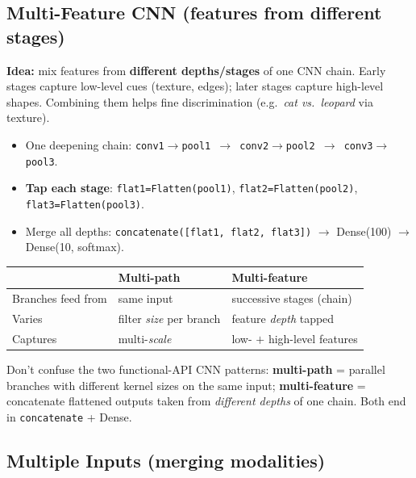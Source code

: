 \documentclass[10pt,a4paper]{article}
\begin{document}
	\subsection{Multi-Feature CNN (features from different stages)}

	\begin{definitionbox}
		\textbf{Idea:} mix features from \textbf{different depths/stages} of one CNN chain. Early stages capture low-level cues (texture, edges); later stages capture high-level shapes. Combining them helps fine discrimination (e.g.\ \emph{cat vs.\ leopard} via texture).
	\end{definitionbox}

	\begin{itemize}[leftmargin=*]
		\item One deepening chain: \texttt{conv1$\to$pool1 $\to$ conv2$\to$pool2 $\to$ conv3$\to$pool3}.
		\item \textbf{Tap each stage}: \texttt{flat1=Flatten(pool1)}, \texttt{flat2=Flatten(pool2)}, \texttt{flat3=Flatten(pool3)}.
		\item Merge all depths: \texttt{concatenate([flat1, flat2, flat3])} $\to$ Dense(100) $\to$ Dense(10, softmax).
	\end{itemize}

	\begin{center}
		\begin{tabular}{@{}lll@{}}
			\toprule
			& \textbf{Multi-path} & \textbf{Multi-feature} \\
			\midrule
			Branches feed from & same input        & successive stages (chain) \\
			Varies             & filter \emph{size} per branch & feature \emph{depth} tapped \\
			Captures           & multi-\emph{scale} & low- $+$ high-level features \\
			\bottomrule
		\end{tabular}
	\end{center}

	\begin{examtipbox}
		Don't confuse the two functional-API CNN patterns: \textbf{multi-path} = parallel branches with different kernel sizes on the same input; \textbf{multi-feature} = concatenate flattened outputs taken from \emph{different depths} of one chain. Both end in \texttt{concatenate} + Dense.
	\end{examtipbox}

	\subsection{Multiple Inputs (merging modalities)}
\end{document}
